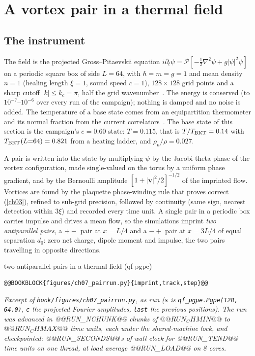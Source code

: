 
\section{A vortex pair in a thermal field}\label{ch07:field}

\subsection*{The instrument}

The field is the projected Gross--Pitaevskii equation $i\partial_t\psi=\mathcal P[-\tfrac12\nabla^2\psi+g|\psi|^2\psi]$ on a periodic square box of side $L=64$, with $\hbar=m=g=1$ and mean density $n=1$ (healing length $\xi=1$, sound speed $c=1$),
$128\times128$ grid points and a sharp cutoff $|k|\le k_c=\pi$, half the grid wavenumber~\cite{Davis2001,Blakie2008}. The energy is conserved (to $10^{-7}$--$10^{-6}$ over every run of the campaign); nothing is damped and no noise is added. The temperature of a
base state comes from an equipartition thermometer and its normal fraction from the current correlators~\cite{Callens2026a}. The base state of this section is the campaign's $e=0.60$ state: $T=0.115$, that is $T/T_{\rm BKT}=0.14$ with $T_{\rm BKT}(L{=}64)=0.821$ from a heating
ladder, and $\rho_n/\rho=0.027$.

A pair is written into the state by multiplying $\psi$ by the Jacobi-theta phase of the vortex configuration, made single-valued on the torus by a uniform phase gradient, and by the Bernoulli amplitude $[1+|\mathbf v|^2/2]^{-1/2}$ of the imprinted flow. Vortices are found by the
plaquette phase-winding rule that  proves correct (\cref{ch03}), refined to sub-grid precision, followed by continuity (same sign, nearest detection within $3\xi$) and recorded every time unit. A single pair in a periodic box carries impulse and drives a mean flow, so the
simulations imprint \emph{two antiparallel pairs}, a $+-$ pair at $x=L/4$ and a $-+$ pair at $x=3L/4$ of equal separation $d_0$: zero net charge, dipole moment and impulse, the two pairs travelling in opposite directions.

\begin{rustbox}{two antiparallel pairs in a thermal field (qf-pgpe)}
\begin{lstlisting}[style=py,basicstyle=\ttfamily\footnotesize]
@@BOOKBLOCK{figures/ch07_pairrun.py}{imprint,track,step}@@
\end{lstlisting}
\nopagebreak[4]\smallskip\noindent\textit{Excerpt of \texttt{book/figures/ch07\_pairrun.py}, as run (\texttt{s} is \texttt{qf\_pgpe.Pgpe(128, 64.0)}, \texttt{c} the projected Fourier amplitudes, \texttt{last} the previous positions). The run was advanced in @@RUN_NCHUNK@@ chunks of $@@RUN_CHMIN@@$ to $@@RUN_CHMAX@@$ time units, each under the
shared-machine lock, and checkpointed: @@RUN_SECONDS@@\,s of wall-clock for @@RUN_TEND@@ time units on one thread, at load average @@RUN_LOAD@@ on 8 cores.}
\end{rustbox}


